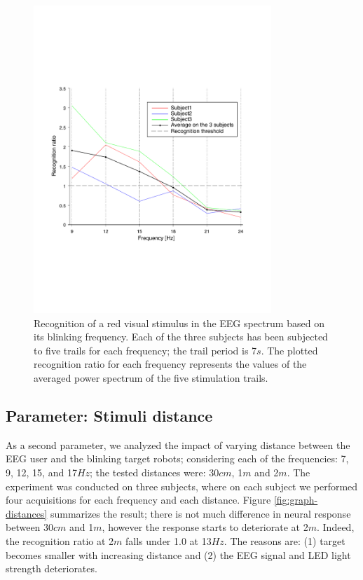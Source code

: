 \documentclass{svmult}
\begin{document}
\begin{figure}
\center
\includegraphics[width=0.8\textwidth]{figures/graph-frequences.pdf}
\caption{Recognition of a red visual stimulus in the EEG spectrum based on its blinking frequency. Each of the three subjects has been subjected to five trails for each frequency; the trail period is 7$s$. The plotted recognition ratio for each frequency represents the values of the averaged power spectrum of the five stimulation trails.} \label{fig:graph-frequences}
\end{figure}

\subsection{Parameter: Stimuli distance}
As a second parameter, we analyzed the impact of varying distance between the EEG user and the blinking target robots; considering each of the frequencies: 7, 9, 12, 15, and 17$Hz$; the tested distances were: 30$cm$, 1$m$ and 2$m$. The experiment was conducted on three subjects, where on each subject we performed four acquisitions for each frequency and each distance. Figure \ref{fig:graph-distances} summarizes the result; there is not much difference in neural response between 30$cm$ and 1$m$, however the response starts to deteriorate at 2$m$. Indeed, the recognition ratio at 2$m$ falls under 1.0 at 13$Hz$. The reasons are: (1) target becomes smaller with increasing distance and (2) the EEG signal and LED light strength deteriorates.
\end{document}
